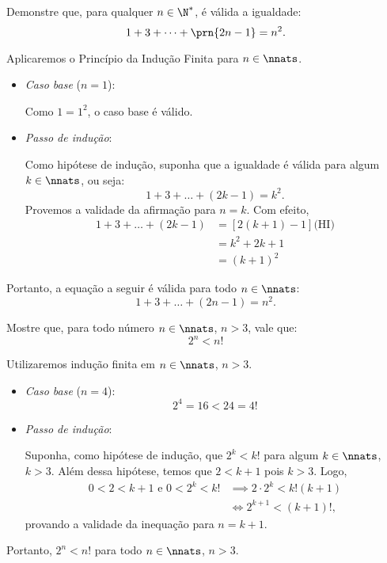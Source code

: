 \begin{example}
Demonstre que, para qualquer $n \in \N^*$, é válida a igualdade:
%
\begin{equation*}
1+3+\dots +\prn {2n-1} = n^2.
\end{equation*}
\end{example}

\begin{solution}
Aplicaremos o Princípio da Indução Finita para $n \in \nnats$.
%
\begin{itemize}
	\item \textit{Caso base} ($n=1$):

	Como $1=1^2$, o caso base é válido.

	\item \textit{Passo de indução}:

	Como hipótese de indução, suponha que a igualdade é válida para algum $k\in \nnats$, ou seja:
	\begin{equation*}
	1+3+\dots+(2k-1) = k^2.
	\end{equation*}
	Provemos a validade da afirmação para $n = k$. Com efeito,
	\begin{align*}
	1+3+\dots + (2k-1) & = \left[2(k+1)-1\right] \text{(HI)} \\
	& = k^2+2k+1 \\
	& = (k+1)^2
	\end{align*}
\end{itemize}
%
Portanto, a equação a seguir é válida para todo $n \in \nnats$:
%
\begin{equation*}
1+3+\dots + (2n-1) = n^2.
\end{equation*}
\end{solution}

\begin{example}
Mostre que, para todo número $n \in \nnats$, $n>3$, vale que:
%
\begin{equation*}
2^n < n!
\end{equation*}
\end{example}

\begin{solution}
Utilizaremos indução finita em $n \in \nnats$, $n >3$.
%
\begin{itemize}
	\item \textit{Caso base} ($n=4$):
	\begin{equation*}
	2^4 =16 < 24=4!
	\end{equation*}  
	\item \textit{Passo de indução}:

	Suponha, como hipótese de indução, que $2^k < k!$ para algum $k \in \nnats$, $k>3$. Além dessa hipótese, temos que $2 < k+1$ pois $k>3$. Logo,
	\begin{align*}
	0<2<k+1 \text{ e } 0<2^k<k! & \implies 2\cdot 2^k < k!(k+1) \\
	& \iff 2^{k+1} < (k+1)!,
	\end{align*}
	provando a validade da inequação para $n=k+1$.
\end{itemize}
%
Portanto, $2^n < n!$ para todo $n \in \nnats$, $n>3$.
\end{solution}

